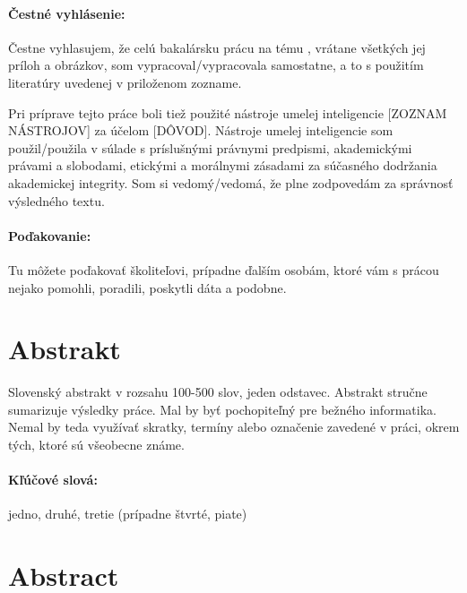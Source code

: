 \documentclass[12pt, oneside]{book}  %
\def\mfnazov{}
\begin{document}
\newpage 
\pagestyle{plain}
\paragraph{Čestné vyhlásenie:}
Čestne vyhlasujem, že celú bakalársku prácu na tému \uv{\mfnazov},
vrátane všetkých jej príloh a obrázkov, som vypracoval/vypracovala
samostatne, a to s použitím literatúry uvedenej v priloženom zozname.

Pri príprave tejto práce boli tiež použité nástroje umelej
inteligencie [ZOZNAM NÁSTROJOV] za účelom [DÔVOD]. Nástroje umelej
inteligencie som použil/použila v súlade s príslušnými právnymi
predpismi, akademickými právami a slobodami, etickými a morálnymi
zásadami za súčasného dodržania akademickej integrity. Som si
vedomý/vedomá, že plne zodpovedám za správnosť výsledného textu.

\paragraph{Poďakovanie:} Tu môžete poďakovať školiteľovi, prípadne
ďalším osobám, ktoré vám s prácou nejako pomohli, poradili,
poskytli dáta a podobne.


\newpage 
\section*{Abstrakt}


Slovenský abstrakt v rozsahu 100-500 slov, jeden odstavec. Abstrakt
stručne sumarizuje výsledky práce. Mal by byť pochopiteľný pre bežného
informatika. Nemal by teda využívať skratky, termíny alebo označenie
zavedené v práci, okrem tých, ktoré sú všeobecne známe.

\paragraph*{Kľúčové slová:} jedno, druhé, tretie (prípadne štvrté, piate)


\newpage 
\section*{Abstract}
\end{document}
